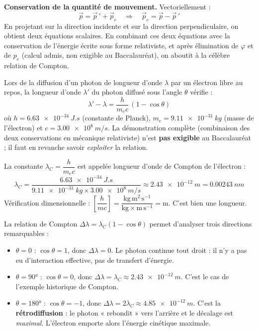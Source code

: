 \documentclass[11pt]{article}
\newcommand{\cle}[1]{{\popxbold\color{popdark}#1}}
\newcounter{popsec}
\newcounter{popsub}
\newcommand{\courssub}[1]{%
  \stepcounter{popsub}%
  \par\vspace{9pt}\noindent{\popxbold\fontsize{11.5}{13}\selectfont\color{popink}{\color{poporange}\thepopsec.\thepopsub}\hspace{6pt}#1}\par\nopagebreak\vspace{4pt}
}
\begin{document}
\textbf{Conservation de la quantité de mouvement.} Vectoriellement :
\[
\vec{p} = \vec{p}\,' + \vec{p}_e
\quad\Longrightarrow\quad
\vec{p}_e = \vec{p} - \vec{p}\,'
\]
En projetant sur la direction incidente et sur la direction perpendiculaire, on obtient deux équations scalaires. En combinant ces deux équations avec la conservation de l'énergie écrite sous forme relativiste, et après élimination de $\varphi$ et de $p_e$ (calcul admis, non exigible au Baccalauréat), on aboutit à la célèbre relation de Compton.

\begin{propriete}
Lors de la diffusion d'un photon de longueur d'onde $\lambda$ par un électron libre au repos, la longueur d'onde $\lambda'$ du photon diffusé sous l'angle $\theta$ vérifie :
\[
\boxed{\lambda' - \lambda = \frac{h}{m_e c}\,(1 - \cos\theta)}
\]
où $h = \SI{6,63e-34}{J.s}$ (constante de Planck), $m_e = \SI{9,11e-31}{kg}$ (masse de l'électron) et $c = \SI{3,00e8}{m/s}$. La démonstration complète (combinaison des deux conservations en mécanique relativiste) n'est \textbf{pas exigible} au Baccalauréat ; il faut en revanche savoir \emph{exploiter} la relation.
\end{propriete}

\begin{aretenir}
La constante $\lambda_C = \dfrac{h}{m_e c}$ est appelée \cle{longueur d'onde de Compton} de l'électron :
\[
\lambda_C = \frac{\SI{6,63e-34}{J.s}}{\SI{9,11e-31}{kg} \times \SI{3,00e8}{m/s}} \approx \SI{2,43e-12}{m} = \SI{0,00243}{nm}
\]
Vérification dimensionnelle : $\left[\dfrac{h}{m c}\right] = \dfrac{\mathrm{kg\,m^2\,s^{-1}}}{\mathrm{kg}\times \mathrm{m\,s^{-1}}} = \mathrm{m}$. C'est bien une longueur.
\end{aretenir}

\courssub{Étude des cas limites et courbe $\Delta\lambda(\theta)$}

La relation de Compton $\Delta\lambda = \lambda_C(1-\cos\theta)$ permet d'analyser trois directions remarquables :

\begin{itemize}
\item $\theta = 0$ : $\cos\theta = 1$, donc $\Delta\lambda = 0$. Le photon continue tout droit : il n'y a pas eu d'interaction effective, pas de transfert d'énergie.
\item $\theta = 90°$ : $\cos\theta = 0$, donc $\Delta\lambda = \lambda_C \approx \SI{2,43e-12}{m}$. C'est le cas de l'exemple historique de Compton.
\item $\theta = 180°$ : $\cos\theta = -1$, donc $\Delta\lambda = 2\lambda_C \approx \SI{4,85e-12}{m}$. C'est la \textbf{rétrodiffusion} : le photon « rebondit » vers l'arrière et le décalage est \emph{maximal}. L'électron emporte alors l'énergie cinétique maximale.
\end{itemize}
\end{document}

